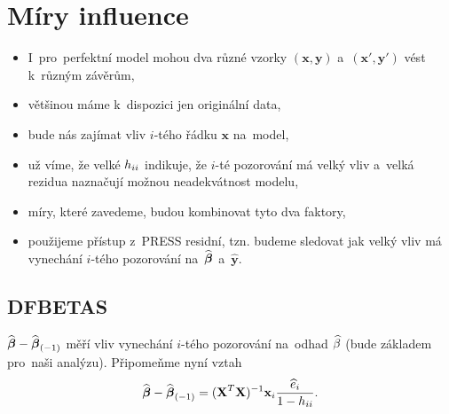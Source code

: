\section{Míry influence}
\begin{itemize}
	\item I~pro~perfektní model mohou dva různé vzorky $(\textbf{x},\textbf{y})$ a~$(\textbf{x}',\textbf{y}')$ vést k~různým závěrům,
	\item většinou máme k~dispozici jen originální data,
	\item bude nás zajímat vliv $i$-tého řádku $\textbf{x}$ na~model,
	\item už víme, že velké $h_{ii}$ indikuje, že $i$-té pozorování má velký vliv a~velká rezidua naznačují možnou neadekvátnost modelu,
	\item míry, které zavedeme, budou kombinovat tyto dva faktory,
	\item použijeme přístup z~PRESS residní, tzn. budeme sledovat jak velký vliv má vynechání $i$-tého pozorování na~$\widehat{\boldsymbol{\beta}}$ a~$\widehat{\textbf{y}}$.
\end{itemize}
\subsection*{DFBETAS}
$\widehat{\boldsymbol{\beta}}-{\widehat{\boldsymbol{\beta}}_{(-1)}}$ měří vliv vynechání $i$-tého pozorování na~odhad $\widehat{\beta}$ (bude základem pro~naši analýzu). Připomeňme nyní vztah 
$$ \widehat{\boldsymbol{\beta}}-{\widehat{\boldsymbol{\beta}}_{(-1)}}=(\textbf{X}^T\textbf{X})^{-1} \textbf{x}_i\frac{\widehat{e}_i}{1-h_{ii}}.$$

